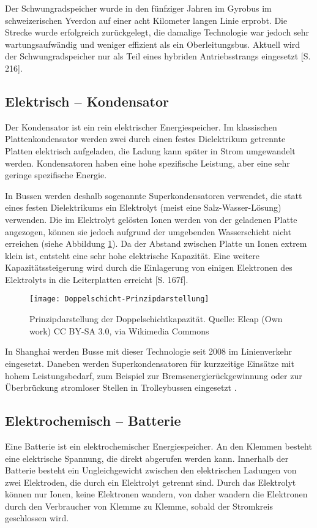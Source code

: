 Der Schwungradspeicher wurde in den fünfziger Jahren im Gyrobus im schweizerischen Yverdon auf einer acht Kilometer langen Linie erprobt. Die Strecke wurde erfolgreich zurückgelegt, die damalige Technologie war jedoch sehr wartungsaufwändig und weniger effizient als ein Oberleitungsbus. Aktuell wird der Schwungradspeicher nur als Teil eines hybriden Antriebsstrangs eingesetzt \cite{tub_aleph001746639}[S. 216].

\subsection{Elektrisch – Kondensator}
Der Kondensator ist ein rein elektrischer Energiespeicher. Im klassischen Plattenkondensator werden zwei durch einen festes Dielektrikum getrennte Platten elektrisch aufgeladen, die Ladung kann später in Strom umgewandelt werden. Kondensatoren haben eine hohe spezifische Leistung, aber eine sehr geringe spezifische Energie.


In Bussen werden deshalb sogenannte Superkondensatoren verwendet, die statt eines festen Dielektrikums ein Elektrolyt (meist eine Salz-Wasser-Lösung) verwenden. Die im Elektrolyt gelösten Ionen werden von der geladenen Platte angezogen, können sie jedoch aufgrund der umgebenden Wasserschicht nicht erreichen (siehe Abbildung \ref{abb_doppelschicht}). Da der Abstand zwischen Platte un Ionen extrem klein ist, entsteht eine sehr hohe elektrische Kapazität. Eine weitere Kapazitätssteigerung wird durch die Einlagerung von einigen Elektronen des Elektrolyts in die Leiterplatten erreicht \cite{Sterner:2014}[S. 167f].

\begin{figure}\centering
	\texttt{[image: Doppelschicht-Prinzipdarstellung]}
	\caption{Prinzipdarstellung der Doppelschichtkapazität. Quelle: Elcap (Own work) CC BY-SA 3.0, via Wikimedia Commons}
	\label{abb_doppelschicht}
\end{figure}

In Shanghai werden Busse mit dieser Technologie seit 2008 im Linienverkehr eingesetzt. Daneben werden Superkondensatoren für kurzzeitige Einsätze mit hohem Leistungsbedarf, zum Beispiel zur Bremsenergierückgewinnung oder zur Überbrückung stromloser Stellen in Trolleybussen eingesetzt \cite{Barminer-Busgesellschaft:2012}.

\subsection{Elektrochemisch – Batterie} %
Eine Batterie ist ein elektrochemischer Energiespeicher. An den Klemmen besteht eine elektrische Spannung, die direkt abgerufen werden kann. Innerhalb der Batterie besteht ein Ungleichgewicht zwischen den elektrischen Ladungen von zwei Elektroden, die durch ein Elektrolyt getrennt sind. Durch das Elektrolyt können nur Ionen, keine Elektronen wandern, von daher wandern die Elektronen durch den Verbraucher von Klemme zu Klemme, sobald der Stromkreis geschlossen wird.

